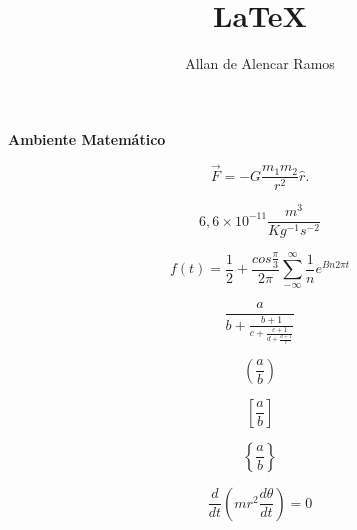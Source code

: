 \documentclass[12pt, a4paper]{article}
\begin{document}
\title{LaTeX}
\author{Allan de Alencar Ramos}
\maketitle

\begin{center}
\large\textbf{Ambiente Matemático}
\end{center}
\vspace{0.5cm}

\begin{equation}
\vec{F} = -G \frac{m_1 m_2}{r^{2}} \hat{r}.
\end{equation}

\begin{equation}
6,6 \times 10^{-11} \frac{m^{3}}{Kg^{-1}s^{-2}}
\end{equation}

\begin{equation}
f(t) = \frac{1}{2} + \frac{cos \frac{\pi}{3}}{2\pi} \sum_{-\infty}^{\infty}  \frac{1}{n} e^{Bn2\pi t}
\end{equation}

\begin{equation}
\frac{ a }{ b + \frac{b+1}{ c + \frac{c+1}{d + \frac{d+1}{e} } } }
\end{equation}

\begin{equation}
\left( \frac{a}{b} \right)
\end{equation}

\begin{equation}
\left[ \frac{a}{b} \right]
\end{equation}

\begin{equation}
\left\lbrace \frac{a}{b} \right\rbrace
\end{equation}

\begin{equation}
\frac{d}{dt} \left( mr^{2} \frac{d\theta}{dt} \right) = 0
\end{equation}
\end{document}
